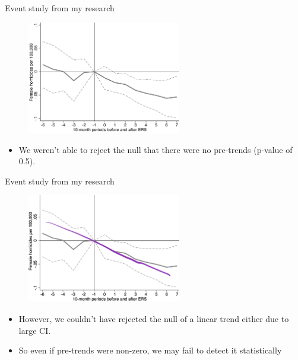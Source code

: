\documentclass{beamer}
\begin{document}
\begin{frame}{Event study from my research}
    \begin{figure}
        \centering
        \includegraphics[width=0.6\textwidth, height=0.6\textheight, keepaspectratio]{./lecture_includes/es_homicides_twfe.pdf}
    \end{figure}
    \begin{itemize}
        \item We weren't able to reject the null that there were no pre-trends (p-value of 0.5).
    \end{itemize}
\end{frame}

\begin{frame}{Event study from my research}
    \begin{figure}
        \centering
        \includegraphics[width=0.6\textwidth, height=0.6\textheight, keepaspectratio]{./lecture_includes/es_lowpower.png}
    \end{figure}
    \begin{itemize}
        \item However, we couldn't have rejected the null of a linear trend either due to large CI.
	\item So even if pre-trends were non-zero, we may fail to detect it statistically
    \end{itemize}
\end{frame}
\end{document}
